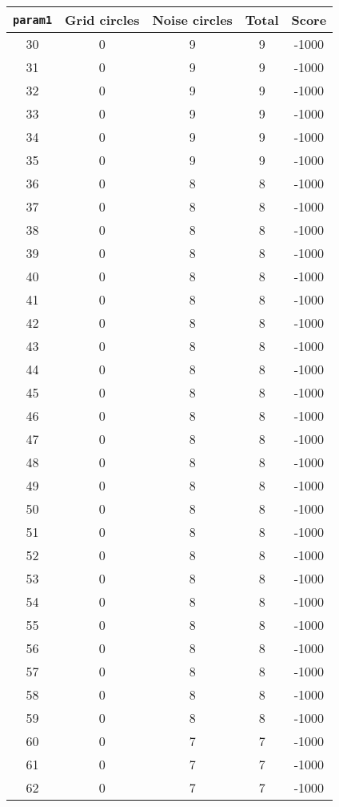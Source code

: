 \documentclass[letterpaper, 12pt]{article}
\begin{document}
\begin{longtable}{|c|c|c|c|c|}
\hline
\textbf{\texttt{param1}} & \textbf{Grid circles} & \textbf{Noise circles} & \textbf{Total} & \textbf{Score} \\
\hline
30 & 0 & 9 & 9 & -1000 \\
\hline
31 & 0 & 9 & 9 & -1000 \\
\hline
32 & 0 & 9 & 9 & -1000 \\
\hline
33 & 0 & 9 & 9 & -1000 \\
\hline
34 & 0 & 9 & 9 & -1000 \\
\hline
35 & 0 & 9 & 9 & -1000 \\
\hline
36 & 0 & 8 & 8 & -1000 \\
\hline
37 & 0 & 8 & 8 & -1000 \\
\hline
38 & 0 & 8 & 8 & -1000 \\
\hline
39 & 0 & 8 & 8 & -1000 \\
\hline
40 & 0 & 8 & 8 & -1000 \\
\hline
41 & 0 & 8 & 8 & -1000 \\
\hline
42 & 0 & 8 & 8 & -1000 \\
\hline
43 & 0 & 8 & 8 & -1000 \\
\hline
44 & 0 & 8 & 8 & -1000 \\
\hline
45 & 0 & 8 & 8 & -1000 \\
\hline
46 & 0 & 8 & 8 & -1000 \\
\hline
47 & 0 & 8 & 8 & -1000 \\
\hline
48 & 0 & 8 & 8 & -1000 \\
\hline
49 & 0 & 8 & 8 & -1000 \\
\hline
50 & 0 & 8 & 8 & -1000 \\
\hline
51 & 0 & 8 & 8 & -1000 \\
\hline
52 & 0 & 8 & 8 & -1000 \\
\hline
53 & 0 & 8 & 8 & -1000 \\
\hline
54 & 0 & 8 & 8 & -1000 \\
\hline
55 & 0 & 8 & 8 & -1000 \\
\hline
56 & 0 & 8 & 8 & -1000 \\
\hline
57 & 0 & 8 & 8 & -1000 \\
\hline
58 & 0 & 8 & 8 & -1000 \\
\hline
59 & 0 & 8 & 8 & -1000 \\
\hline
60 & 0 & 7 & 7 & -1000 \\
\hline
61 & 0 & 7 & 7 & -1000 \\
\hline
62 & 0 & 7 & 7 & -1000 \\

\end{longtable}
\end{document}
